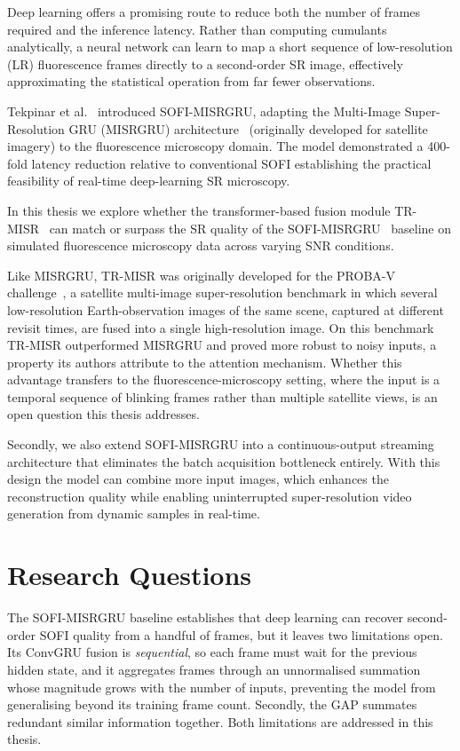 Deep learning offers a promising route to reduce both the number of frames
required and the inference latency.
Rather than computing cumulants analytically, a neural network can learn to map
a short sequence of low-resolution (LR) fluorescence frames directly to a
second-order SR image, effectively approximating the statistical operation from
far fewer observations.

Tekpinar et al.~\cite{resurf2024} introduced
SOFI-MISRGRU, adapting the Multi-Image Super-Resolution GRU
(MISRGRU) architecture~\cite{MISRGRU-original} (originally developed for
satellite imagery) to the fluorescence microscopy domain.
The model demonstrated a
400-fold latency reduction relative to conventional SOFI establishing the
practical feasibility of real-time deep-learning SR microscopy.

In this thesis we explore whether the transformer-based fusion module TR-MISR~\cite{TR-MISR-original}
can match or surpass the SR quality of the SOFI-MISRGRU~\cite{resurf2024} baseline on simulated
fluorescence microscopy data across varying SNR conditions.

Like MISRGRU, TR-MISR was originally developed for the PROBA-V challenge~\cite{TR-MISR-original},
a satellite multi-image super-resolution benchmark in which several low-resolution
Earth-observation images of the same scene, captured at different revisit times, are fused into
a single high-resolution image. 
On this benchmark TR-MISR outperformed MISRGRU and proved more
robust to noisy inputs, a property its authors attribute to the attention mechanism. Whether
this advantage transfers to the fluorescence-microscopy setting, where the input is a temporal
sequence of blinking frames rather than multiple satellite views, is an open question this thesis
addresses.

Secondly, we also extend SOFI-MISRGRU into a continuous-output streaming architecture 
that eliminates the batch acquisition bottleneck entirely. With this design the model
can combine more input images, which enhances the reconstruction quality while
enabling uninterrupted super-resolution video generation from dynamic samples in real-time.


\section{Research Questions}
\label{sec:research_questions}

The SOFI-MISRGRU baseline establishes that deep learning can recover second-order SOFI
quality from a handful of frames, but it leaves two limitations open. Its ConvGRU fusion is
\emph{sequential}, so each frame must wait for the previous hidden state, and it aggregates
frames through an unnormalised summation whose magnitude grows with the number of inputs,
preventing the model from generalising beyond its training frame count. Secondly, the GAP summates 
redundant similar information together. Both limitations are
addressed in this thesis. 

